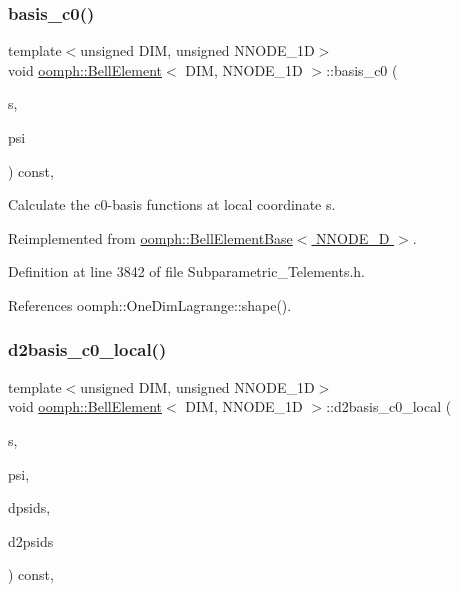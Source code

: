 \subsubsection{\texorpdfstring{basis\+\_\+c0()}{basis\_c0()}}
{\footnotesize\ttfamily template$<$unsigned D\+IM, unsigned N\+N\+O\+D\+E\+\_\+1D$>$ \\
void \hyperlink{classoomph_1_1BellElement}{oomph\+::\+Bell\+Element}$<$ D\+IM, N\+N\+O\+D\+E\+\_\+1D $>$\+::basis\+\_\+c0 (\begin{DoxyParamCaption}\item[{const \hyperlink{classoomph_1_1Vector}{Vector}$<$ double $>$ \&}]{s,  }\item[{\hyperlink{classoomph_1_1Shape}{Shape} \&}]{psi }\end{DoxyParamCaption}) const\hspace{0.3cm}{\ttfamily [inline]}, {\ttfamily [virtual]}}



Calculate the c0-\/basis functions at local coordinate s. 



Reimplemented from \hyperlink{classoomph_1_1BellElementBase_a2c9a75b9d07c0aa569ba24d2b3228800}{oomph\+::\+Bell\+Element\+Base$<$ N\+N\+O\+D\+E\+\_\+D $>$}.



Definition at line 3842 of file Subparametric\+\_\+\+Telements.\+h.



References oomph\+::\+One\+Dim\+Lagrange\+::shape().

\mbox{\label{classoomph_1_1BellElement_a23f34f6479128e7e8c694fbcb72aae78}} 
\subsubsection{\texorpdfstring{d2basis\+\_\+c0\+\_\+local()}{d2basis\_c0\_local()}}
{\footnotesize\ttfamily template$<$unsigned D\+IM, unsigned N\+N\+O\+D\+E\+\_\+1D$>$ \\
void \hyperlink{classoomph_1_1BellElement}{oomph\+::\+Bell\+Element}$<$ D\+IM, N\+N\+O\+D\+E\+\_\+1D $>$\+::d2basis\+\_\+c0\+\_\+local (\begin{DoxyParamCaption}\item[{const \hyperlink{classoomph_1_1Vector}{Vector}$<$ double $>$ \&}]{s,  }\item[{\hyperlink{classoomph_1_1Shape}{Shape} \&}]{psi,  }\item[{\hyperlink{classoomph_1_1DShape}{D\+Shape} \&}]{dpsids,  }\item[{\hyperlink{classoomph_1_1DShape}{D\+Shape} \&}]{d2psids }\end{DoxyParamCaption}) const\hspace{0.3cm}{\ttfamily [inline]}, {\ttfamily [virtual]}}



